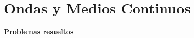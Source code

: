 \documentclass[/home/hernan-barquero/Documents/Apuntes_mecanica_teorica/main.tex]{subfiles}
\begin{document}
    \part{Ondas y Medios Continuos}

    \subsection{Problemas resueltos}
    
\end{document}
